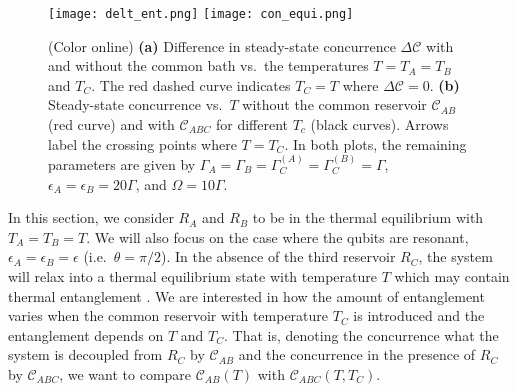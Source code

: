 \documentclass[12pt]{iopart}
\begin{document}
\begin{figure}[tbp]
\begin{center}
{\texttt{[image: delt\_ent.png]} %
\texttt{[image: con\_equi.png]} %
}
\end{center}
\caption{(Color online) \textbf{(a)} Difference in steady-state concurrence $\Delta\mathcal{C}$ with and without the common bath vs.~the temperatures $T=T_A=T_B$ and $T_{C}$. The red dashed curve indicates $T_{C}=T$ where $\Delta\mathcal{C}=0$. \textbf{(b)} Steady-state concurrence vs.~$T$ without the common reservoir $\mathcal{C}_{AB}$ (red curve) and with $\mathcal{C}_{ABC}$ for different $T_{c}$ (black curves). Arrows label the crossing points where $T=T_C$. In both plots, the remaining parameters are given by $\Gamma_{A}=\Gamma_{B}=\Gamma_{C}^{(A)}=\Gamma_{C}^{(B)}=\Gamma$, $\epsilon_{A}=\epsilon_{B}=20\Gamma$, and $\Omega=10\Gamma$. }
\label{ent-equi}
\end{figure}

In this section, we consider $R_{A}$ and $R_{B}$ to be in the thermal equilibrium with $T_{A}=T_{B}=T$. We will also focus on the case where the qubits are resonant, $\epsilon_A=\epsilon_B=\epsilon$ (i.e.~$\theta=\pi/2$). In the absence of the third reservoir $R_C$, the system will relax into a thermal equilibrium state with temperature $T$ which may contain thermal entanglement \cite{equi1,equi2,equi3,equi4,equi5,equi6,equi7}. We are interested in how the amount of entanglement varies when the common reservoir with temperature $T_{C}$ is introduced and the entanglement depends on $T$ and $T_{C}$. That is, denoting the concurrence what the system is decoupled from $R_C$ by $\mathcal{C}_{AB}$ and the concurrence in the presence of $R_C$ by $\mathcal{C}_{ABC}$, we want to compare $\mathcal{C}_{AB}(T)$ with $\mathcal{C}_{ABC}(T,T_C)$.
\end{document}
